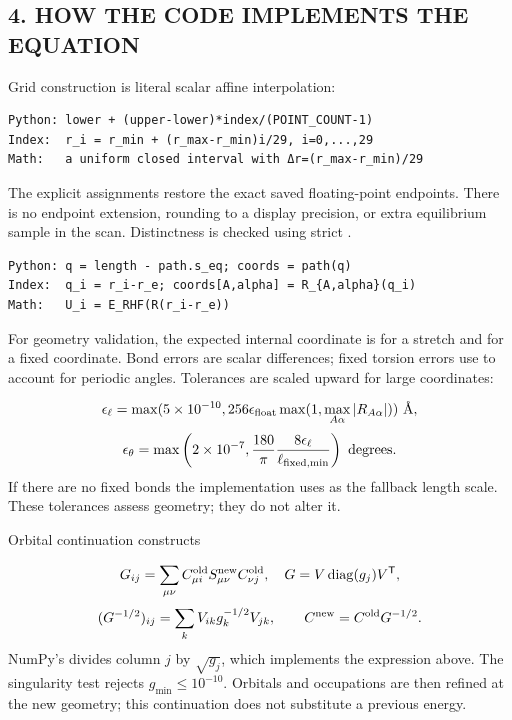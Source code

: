 \documentclass[10pt,a4paper]{article}
\begin{document}
\subsection{4. HOW THE CODE IMPLEMENTS THE EQUATION}
Grid construction is literal scalar affine interpolation:

\begin{Verbatim}
Python: lower + (upper-lower)*index/(POINT_COUNT-1)
Index:  r_i = r_min + (r_max-r_min)i/29, i=0,...,29
Math:   a uniform closed interval with Δr=(r_max-r_min)/29
\end{Verbatim}
The explicit assignments  restore the exact saved floating-point endpoints. There is no endpoint extension, rounding to a display precision, or extra equilibrium sample in the scan. Distinctness is checked using strict \code{<}.

\begin{Verbatim}
Python: q = length - path.s_eq; coords = path(q)
Index:  q_i = r_i-r_e; coords[A,alpha] = R_{A,alpha}(q_i)
Math:   U_i = E_RHF(R(r_i-r_e))
\end{Verbatim}
For geometry validation, the expected internal coordinate is  for a stretch and  for a fixed coordinate. Bond errors are scalar differences; fixed torsion errors use  to account for periodic angles. Tolerances are scaled upward for large coordinates:

\[
\epsilon_\ell=\max(5\times10^{-10},256\epsilon_{\rm float}\max(1,\max_{A\alpha}|R_{A\alpha}|))\ \text{\text{Å}},
\]
\[
\epsilon_\theta=\max\left(2\times10^{-7},\frac{180}{\pi}\frac{8\epsilon_\ell}{\ell_{\rm fixed,min}}\right)\ \text{degrees}.
\]
If there are no fixed bonds the implementation uses  as the fallback length scale. These tolerances assess geometry; they do not alter it.

Orbital continuation constructs

\[
G_{ij}=\sum_{\mu\nu}C^{\rm old}_{\mu i}S^{\rm new}_{\mu\nu}C^{\rm old}_{\nu j},\quad
G=V\operatorname{diag}(g_j)V^{\mathsf T},
\]
\[
(G^{-1/2})_{ij}=\sum_k V_{ik}g_k^{-1/2}V_{jk},\qquad
C^{\rm new}=C^{\rm old}G^{-1/2}.
\]
NumPy's  divides column \(j\) by \(\sqrt{g_j}\), which implements the expression above. The singularity test rejects \(g_{\min}\le10^{-10}\). Orbitals and occupations are then refined at the new geometry; this continuation does not substitute a previous energy.
\end{document}
